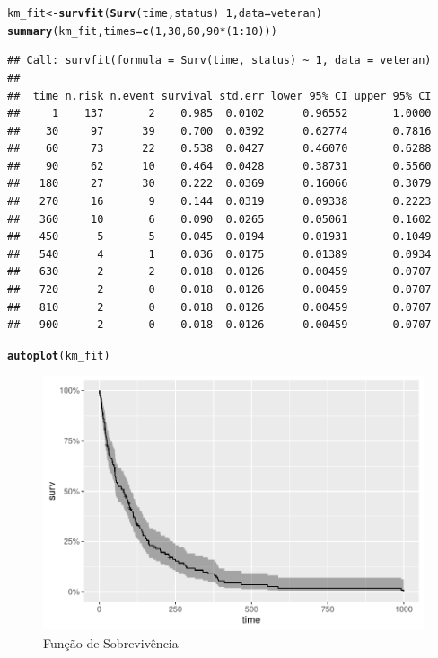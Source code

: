 \documentclass[a4paper, oneside]{book}\usepackage[]{graphicx}\usepackage[]{color}
\makeatletter
\def\maxwidth{ %
  \ifdim\Gin@nat@width>\linewidth
    \linewidth
  \else
    \Gin@nat@width
  \fi
}
\newcommand{\hlnum}[1]{\textcolor[rgb]{0.686,0.059,0.569}{#1}}%
\newcommand{\hlopt}[1]{\textcolor[rgb]{0,0,0}{#1}}%
\newcommand{\hlstd}[1]{\textcolor[rgb]{0.345,0.345,0.345}{#1}}%
\newcommand{\hlkwb}[1]{\textcolor[rgb]{0.69,0.353,0.396}{#1}}%
\newcommand{\hlkwc}[1]{\textcolor[rgb]{0.333,0.667,0.333}{#1}}%
\newcommand{\hlkwd}[1]{\textcolor[rgb]{0.737,0.353,0.396}{\textbf{#1}}}%
\newenvironment{kframe}{%
 \def\at@end@of@kframe{}%
 \ifinner\ifhmode%
  \def\at@end@of@kframe{\end{minipage}}%
  \begin{minipage}{\columnwidth}%
 \fi\fi%
 \def\FrameCommand##1{\hskip\@totalleftmargin \hskip-\fboxsep
 \colorbox{shadecolor}{##1}\hskip-\fboxsep
     \hskip-\linewidth \hskip-\@totalleftmargin \hskip\columnwidth}%
 \MakeFramed {\advance\hsize-\width
   \@totalleftmargin\z@ \linewidth\hsize
   \@setminipage}}%
 {\par\unskip\endMakeFramed%
 \at@end@of@kframe}
\newenvironment{knitrout}{}{} %
\makeatother
\begin{document}
\begin{knitrout}
\color{fgcolor}\begin{kframe}
\begin{alltt}
\hlstd{km_fit} \hlkwb{<-} \hlkwd{survfit}\hlstd{(}\hlkwd{Surv}\hlstd{(time, status)} \hlopt{~} \hlnum{1}\hlstd{,} \hlkwc{data}\hlstd{=veteran)}
\hlkwd{summary}\hlstd{(km_fit,} \hlkwc{times} \hlstd{=} \hlkwd{c}\hlstd{(}\hlnum{1}\hlstd{,}\hlnum{30}\hlstd{,}\hlnum{60}\hlstd{,}\hlnum{90}\hlopt{*}\hlstd{(}\hlnum{1}\hlopt{:}\hlnum{10}\hlstd{)))}
\end{alltt}
\begin{verbatim}
## Call: survfit(formula = Surv(time, status) ~ 1, data = veteran)
## 
##  time n.risk n.event survival std.err lower 95% CI upper 95% CI
##     1    137       2    0.985  0.0102      0.96552       1.0000
##    30     97      39    0.700  0.0392      0.62774       0.7816
##    60     73      22    0.538  0.0427      0.46070       0.6288
##    90     62      10    0.464  0.0428      0.38731       0.5560
##   180     27      30    0.222  0.0369      0.16066       0.3079
##   270     16       9    0.144  0.0319      0.09338       0.2223
##   360     10       6    0.090  0.0265      0.05061       0.1602
##   450      5       5    0.045  0.0194      0.01931       0.1049
##   540      4       1    0.036  0.0175      0.01389       0.0934
##   630      2       2    0.018  0.0126      0.00459       0.0707
##   720      2       0    0.018  0.0126      0.00459       0.0707
##   810      2       0    0.018  0.0126      0.00459       0.0707
##   900      2       0    0.018  0.0126      0.00459       0.0707
\end{verbatim}
\begin{alltt}
\hlkwd{autoplot}\hlstd{(km_fit)}
\end{alltt}
\end{kframe}\begin{figure}

{\centering \includegraphics[width=\maxwidth]{figure/figura1-1} 

}

\caption[Função de Sobrevivência]{Função de Sobrevivência}\label{fig:figura1}
\end{figure}


\end{knitrout}
\end{document}
